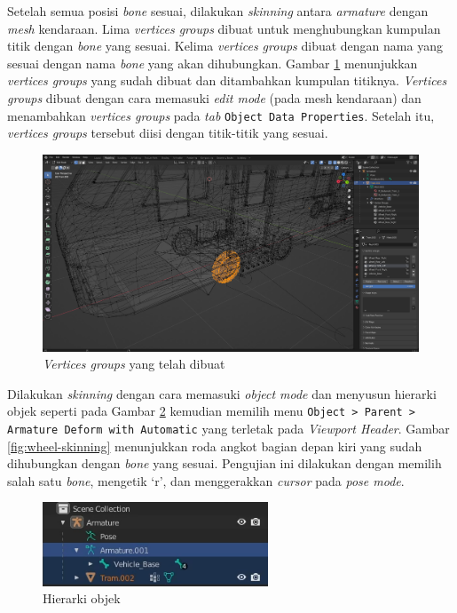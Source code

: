 Setelah semua posisi \textit{bone} sesuai, dilakukan \textit{skinning} antara
\textit{armature} dengan \textit{mesh} kendaraan. Lima \textit{vertices groups}
dibuat untuk menghubungkan kumpulan titik dengan \textit{bone} yang sesuai.
Kelima \textit{vertices groups} dibuat dengan nama yang sesuai dengan nama
\textit{bone} yang akan dihubungkan. Gambar \ref{fig:vertices-groups}
menunjukkan \textit{vertices groups} yang sudah dibuat dan ditambahkan kumpulan
titiknya. \textit{Vertices groups} dibuat dengan cara memasuki \textit{edit
mode} (pada mesh kendaraan) dan menambahkan \textit{vertices groups} pada
\textit{tab} \verb|Object Data Properties|. Setelah itu, \textit{vertices
groups} tersebut diisi dengan titik-titik yang sesuai.

\begin{figure}[!h]
    \centering
    \includegraphics[width=1\textwidth]{resources/chapter-4/vertices-groups.png}
    \caption{\textit{Vertices groups} yang telah dibuat}
    \label{fig:vertices-groups}
\end{figure}

Dilakukan \textit{skinning} dengan cara memasuki \textit{object mode} dan
menyusun hierarki objek seperti pada Gambar \ref{fig:skinning-hierarchy}
kemudian memilih menu \verb|Object > Parent > Armature Deform with Automatic|
yang terletak pada \textit{Viewport Header}. Gambar \ref{fig:wheel-skinning}
menunjukkan roda angkot bagian depan kiri yang sudah dihubungkan dengan
\textit{bone} yang sesuai. Pengujian ini dilakukan dengan memilih salah satu
\textit{bone}, mengetik `r', dan menggerakkan \textit{cursor} pada \textit{pose
mode}.

\begin{figure}[!h]
    \centering
    \includegraphics[width=0.6\textwidth]{resources/chapter-4/skinning-hierarchy.png}
    \caption{Hierarki objek}
    \label{fig:skinning-hierarchy}
\end{figure}


